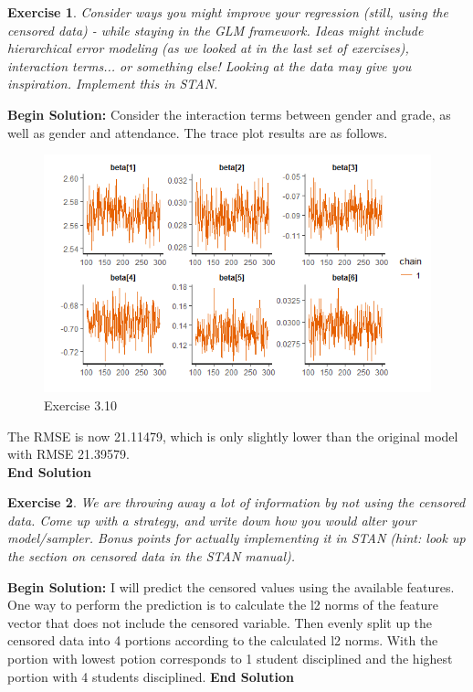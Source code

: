 \documentclass[twoside]{article}
\newcounter{lecnum}
\newtheorem{exercise}{Exercise}[lecnum]
\begin{document}
  \begin{exercise}
    Consider ways you might improve your regression (still, using the censored data) - while staying in the GLM framework.  Ideas might include hierarchical error modeling (as we looked at in the last set of exercises), interaction terms... or something else! Looking at the data may give you inspiration. Implement this in STAN.
  \end{exercise}
\textbf{Begin Solution:}
Consider the interaction terms between gender and grade, as well as gender and attendance. The trace plot results are as follows.\\
\begin{figure}[H]
\begin{center}
\includegraphics[width=\textwidth]{./MATLAB/3.9/beta6.png}
\end{center}
\caption{Exercise 3.10}
\label{Feature: Grade and some more and more}
\end{figure}
The RMSE is now 21.11479, which is only slightly lower than the original model with RMSE 21.39579.\\
\textbf{End Solution}
  
  \begin{exercise}
    We are throwing away a lot of information by not using the censored data. Come up with a strategy, and write down how you would alter your model/sampler. Bonus points for actually implementing it in STAN (hint: look up the section on censored data in the STAN manual).
  \end{exercise}
\textbf{Begin Solution:}
I will predict the censored values using the available features. One way to perform the prediction is to calculate the l2 norms of the feature vector that does not include the censored variable. Then evenly split up the censored data into 4 portions according to the calculated l2 norms. With the portion with lowest potion corresponds to 1 student disciplined and the highest portion with 4 students disciplined.
\textbf{End Solution}
  
  
\end{document}
